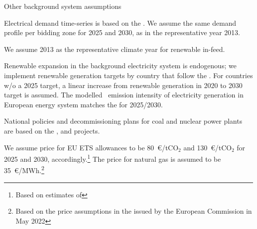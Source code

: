 \begin{frame}{Other background system assumptions}

\begin{itemize}
  {\small 
\item Electrical demand time-series is based on the 
. 
We assume the same demand profile per bidding zone for 2025 and 2030, as in the representative year 2013. 
\item We assume 2013 as the representative climate year for renewable in-feed.
\item Renewable expansion in the background electricity system is endogenous; we implement renewable generation targets by country that follow the . For countries w/o a 2025 target, a linear increase from renewable generation in 2020 to 2030 target is assumed. The modelled \co~emission intensity of electricity generation in European energy system matches the  for 2025/2030.
\item  National policies and decommissioning plans for coal and nuclear 
power plants are based on the 
, 
and  projects.
\item We assume price for EU ETS allowances to be 80~\euro/tCO$_2$ 
and 130~\euro/tCO$_2$ for 2025 and 2030, accordingly.\footnote{{\scriptsize 
Based on estimates of 
}}
The price for natural gas is assumed to be 35~\euro/MWh.\footnote{{\scriptsize Based on the price assumptions in the 
issued by the European Commission in May 2022}}
}
\vspace{0.2cm}
\end{itemize}

\end{frame}


